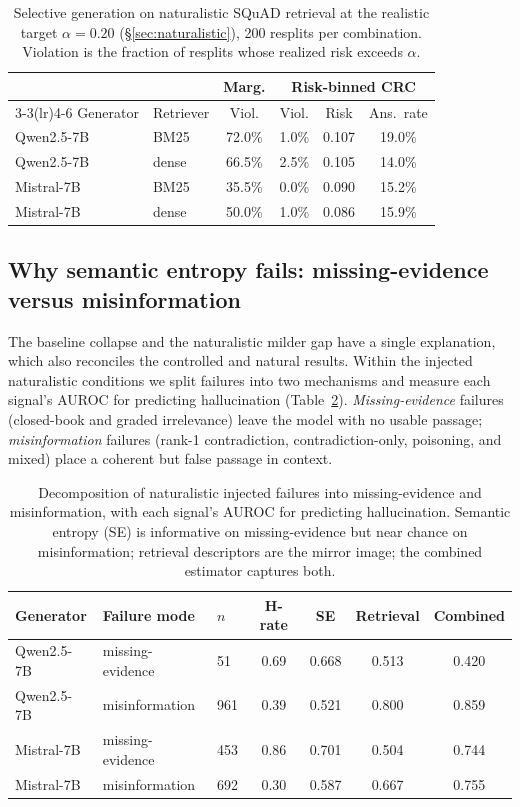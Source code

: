\documentclass[sn-basic]{sn-jnl}
\theoremstyle{thmstyleone}
\theoremstyle{thmstyletwo}
\begin{document}
\begin{table}[tbp]
\centering\footnotesize\setlength{\tabcolsep}{4pt}
\caption{Selective generation on naturalistic SQuAD retrieval at the
realistic target $\alpha = 0.20$ (\S\ref{sec:naturalistic}), 200
resplits per combination. Violation is the fraction of resplits whose
realized risk exceeds $\alpha$.}
\label{tab:natcrc}
\begin{tabular}{llcccc}
\toprule
& & \multicolumn{1}{c}{Marg.} & \multicolumn{3}{c}{Risk-binned CRC} \\
\cmidrule(lr){3-3}\cmidrule(lr){4-6}
Generator & Retriever & Viol. & Viol. & Risk & Ans.\ rate \\
\midrule
Qwen2.5-7B & BM25  & 72.0\% & 1.0\% & 0.107 & 19.0\% \\
Qwen2.5-7B & dense & 66.5\% & 2.5\% & 0.105 & 14.0\% \\
Mistral-7B & BM25  & 35.5\% & 0.0\% & 0.090 & 15.2\% \\
Mistral-7B & dense & 50.0\% & 1.0\% & 0.086 & 15.9\% \\
\bottomrule
\end{tabular}
\end{table}



\subsection{Why semantic entropy fails: missing-evidence versus
misinformation}\label{sec:decomp}
The baseline collapse and the naturalistic milder gap have a single
explanation, which also reconciles the controlled and natural results.
Within the injected naturalistic conditions we split failures into two
mechanisms and measure each signal's AUROC for predicting hallucination
(Table~\ref{tab:decomp}). \emph{Missing-evidence} failures (closed-book
and graded irrelevance) leave the model with no usable passage;
\emph{misinformation} failures (rank-1 contradiction, contradiction-only,
poisoning, and mixed) place a coherent but false passage in context.

\begin{table}[tbp]
\centering\small
\caption{Decomposition of naturalistic injected failures into
missing-evidence and misinformation, with each signal's AUROC for
predicting hallucination. Semantic entropy (SE) is informative on
missing-evidence but near chance on misinformation; retrieval
descriptors are the mirror image; the combined estimator captures both.}
\label{tab:decomp}
\begin{tabular}{lllcccc}
\toprule
Generator & Failure mode & $n$ & H-rate & SE & Retrieval & Combined \\
\midrule
Qwen2.5-7B & missing-evidence & 51  & 0.69 & 0.668 & 0.513 & 0.420 \\
Qwen2.5-7B & misinformation   & 961 & 0.39 & 0.521 & 0.800 & 0.859 \\
Mistral-7B & missing-evidence & 453 & 0.86 & 0.701 & 0.504 & 0.744 \\
Mistral-7B & misinformation   & 692 & 0.30 & 0.587 & 0.667 & 0.755 \\
\bottomrule
\end{tabular}
\end{table}
\end{document}
